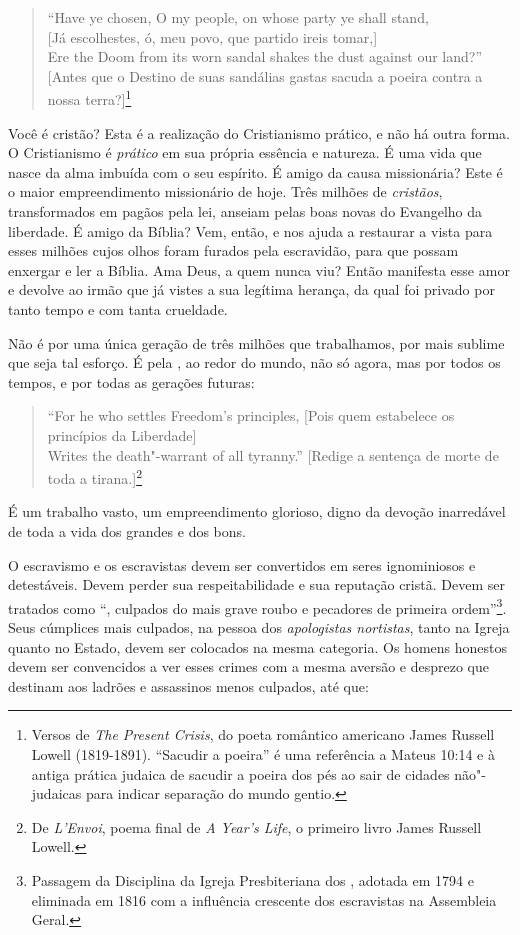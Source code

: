 \begin{verse}
``Have ye chosen, O my people, on whose \qb{}party ye shall stand,\\
{[}Já escolhestes, ó, meu povo, que partido ireis \qb{}tomar,{]}\\
Ere the Doom from its worn sandal shakes \qb{}the dust against our land?''\\
{[}Antes que o Destino de suas sandálias \qb{}gastas sacuda a poeira contra a
\qb{}nossa terra?{]}\footnote{Versos de \emph{The Present Crisis}, do poeta
  romântico americano James Russell Lowell (1819-1891). ``Sacudir a
  poeira'' é uma referência a Mateus 10:14 e à antiga prática judaica de
  sacudir a poeira dos pés ao sair de cidades não"-judaicas para indicar
  separação do mundo gentio.}
\end{verse}

Você é cristão? Esta é a realização do Cristianismo prático, e não há
outra forma. O Cristianismo é \emph{prático} em sua própria essência e
natureza. É uma vida que nasce da alma imbuída com o seu espírito. É
amigo da causa missionária? Este é o maior empreendimento missionário de
hoje. Três milhões de \emph{cristãos}, transformados em pagãos pela lei,
anseiam pelas boas novas do Evangelho da liberdade. É amigo da Bíblia?
Vem, então, e nos ajuda a restaurar a vista para esses milhões cujos
olhos foram furados pela escravidão, para que possam enxergar e ler a
Bíblia. Ama Deus, a quem nunca viu? Então manifesta esse amor e devolve
ao irmão que já vistes a sua legítima herança, da qual foi privado por
tanto tempo e com tanta crueldade.

Não é por uma única geração de três milhões que trabalhamos, por mais
sublime que seja tal esforço. É pela , ao redor do mundo, não
só agora, mas por todos os tempos, e por todas as gerações futuras:

\begin{quote}
``For he who settles Freedom's principles, {[}Pois quem estabelece os
princípios da Liberdade{]}\\
Writes the death"-warrant of all tyranny.'' {[}Redige a sentença de morte
de toda a tirana.{]}\footnote{De \emph{L'Envoi}, poema final de \emph{A
  Year's Life}, o primeiro livro James Russell Lowell.}
\end{quote}

É um trabalho vasto, um empreendimento glorioso, digno da devoção
inarredável de toda a vida dos grandes e dos bons.

O escravismo e os escravistas devem ser convertidos em seres
ignominiosos e detestáveis. Devem perder sua respeitabilidade e sua
reputação cristã. Devem ser tratados como ``, culpados
do mais grave roubo e pecadores de primeira ordem''\footnote{Passagem da
  Disciplina da Igreja Presbiteriana dos , adotada em 1794 e
  eliminada em 1816 com a influência crescente dos escravistas na
  Assembleia Geral.}. Seus cúmplices mais culpados, na pessoa dos
\emph{apologistas nortistas}, tanto na Igreja quanto no Estado, devem
ser colocados na mesma categoria. Os homens honestos devem ser
convencidos a ver esses crimes com a mesma aversão e desprezo que
destinam aos ladrões e assassinos menos culpados, até que:

